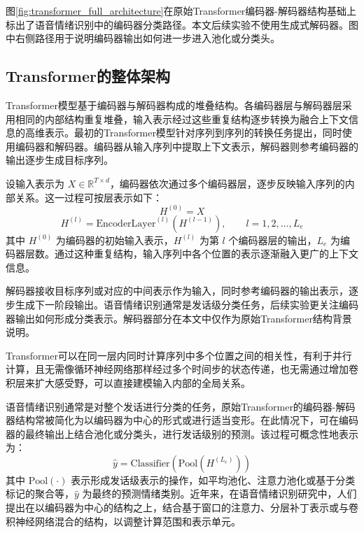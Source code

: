 图\ref{fig:transformer_full_architecture}在原始Transformer编码器-解码器结构基础上标出了语音情绪识别中的编码器分类路径。本文后续实验不使用生成式解码器。图中右侧路径用于说明编码器输出如何进一步进入池化或分类头。



\subsection{Transformer的整体架构}

Transformer模型基于编码器与解码器构成的堆叠结构。各编码器层与解码器层采用相同的内部结构重复堆叠，输入表示经过这些重复结构逐步转换为融合上下文信息的高维表示\cite{vaswani2017attention}。最初的Transformer模型针对序列到序列的转换任务提出，同时使用编码器和解码器。编码器从输入序列中提取上下文表示，解码器则参考编码器的输出逐步生成目标序列。

设输入表示为 $X \in \mathbb{R}^{T \times d}$，编码器依次通过多个编码器层，逐步反映输入序列的内部关系。这一过程可按层表示如下：
\begin{equation}
H^{(0)} = X
\label{eq:transformer_encoder_input}
\end{equation}
\begin{equation}
H^{(l)} = \mathrm{EncoderLayer}^{(l)}\!\left(H^{(l-1)}\right), \qquad l=1,2,\dots,L_e
\label{eq:transformer_encoder_stack}
\end{equation}
其中 $H^{(0)}$ 为编码器的初始输入表示，$H^{(l)}$ 为第 $l$ 个编码器层的输出，$L_e$ 为编码器层数。通过这种重复结构，输入序列中各个位置的表示逐渐融入更广的上下文信息\cite{vaswani2017attention}。

解码器接收目标序列或对应的中间表示作为输入，同时参考编码器的输出表示，逐步生成下一阶段输出。语音情绪识别通常是发话级分类任务，后续实验更关注编码器输出如何形成分类表示。解码器部分在本文中仅作为原始Transformer结构背景说明\cite{vaswani2017attention}。

Transformer可以在同一层内同时计算序列中多个位置之间的相关性，有利于并行计算，且无需像循环神经网络那样经过多个时间步的状态传递，也无需通过增加卷积层来扩大感受野，可以直接建模输入内部的全局关系\cite{vaswani2017attention,chen2023dwformer,wang2024swin}。

语音情绪识别通常是对整个发话进行分类的任务，原始Transformer的编码器-解码器结构常被简化为以编码器为中心的形式或进行适当变形\cite{chen2023dwformer,wang2024swin,ahn2025multitask}。在此情况下，可在编码器的最终输出上结合池化或分类头，进行发话级别的预测。该过程可概念性地表示为：
\begin{equation}
\hat{y} = \mathrm{Classifier}\!\left(\mathrm{Pool}\!\left(H^{(L_e)}\right)\right)
\label{eq:transformer_ser_prediction}
\end{equation}
其中 $\mathrm{Pool}(\cdot)$ 表示形成发话级表示的操作，如平均池化、注意力池化或基于分类标记的聚合等，$\hat{y}$ 为最终的预测情绪类别。近年来，在语音情绪识别研究中，人们提出在以编码器为中心的结构之上，结合基于窗口的注意力、分层补丁表示或与卷积神经网络混合的结构，以调整计算范围和表示单元\cite{liu2023dualrobustness,chen2023dwformer,wang2024swin,ahn2025multitask}。

